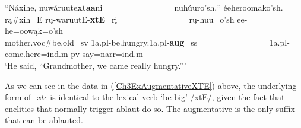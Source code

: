 \begin{exe}
\begin{xlist}
	\item \glll ``Náxihe, nuwáruute\textbf{xtaa}ni ~ ~ ~ ~ ~ ~ ~ ~ ~ ~ nuhúuro'sh,'' éeheroomako'sh.\\
	rą\#xih=E rų-waruutE-\textbf{xtE}=rį ~ ~ ~ ~ ~ ~ ~ ~ ~ ~  rų-huu=o'sh ee-he=oowąk=o'sh\\
	\textnormal{mother}.voc\#\textnormal{be.old}=sv 1a.pl-\textnormal{be.hungry}.1a.pl-\textbf{aug}=ss ~ ~ ~ ~ ~ ~ ~ ~ ~ ~ 1a.pl-\textnormal{come.here}=ind.m pv-\textnormal{say}=narr=ind.m\\
	\glt `He said, ``Grandmother, we came really hungry.{''}' \citep[266]{hollow1973a}
	
	\end{xlist}

\end{exe}

\largerpage
As we can see in the data in (\ref{Ch3ExAugmentativeXTE}) above, the underlying form of \textit{-xte} is identical to the lexical verb `be big' /xtE/, given the fact that enclitics that normally trigger ablaut do so. The augmentative is the only suffix that can be ablauted.







	
	
